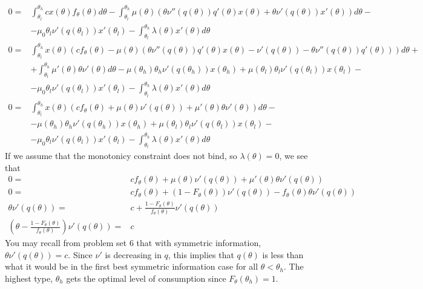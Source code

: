 \documentclass[12pt,reqno]{amsart}
\theoremstyle{definition}
\begin{document}
\begin{align*}
  0 = & \int_{\theta_l}^{\theta_h} c x(\theta) f_\theta(\theta)
  d\theta - \int_{\theta_l}^{\theta_h} \mu(\theta)
  \left( \theta \nu''(q(\theta))q'(\theta) x(\theta) + \theta
    \nu'(q(\theta)) x'(\theta) \right)d\theta - \\
  & - \mu_0 \theta_l
  \nu'(q(\theta_l))x'(\theta_l) - \int_{\theta_l}^{\theta_h}
  \lambda(\theta) x'(\theta) d\theta \\
  0 = & \int_{\theta_l}^{\theta_h} x(\theta)\left( c f_\theta(\theta)
    - \mu(\theta) \left( \theta \nu''(q(\theta))q'(\theta) x(\theta) -
      \nu'(q(\theta)) - \theta \nu''(q(\theta))q'(\theta) \right) \right)
  d\theta + \\
  & + \int_{\theta_l}^{\theta_h} 
  \mu'(\theta) \theta \nu'(\theta) d\theta 
  - \mu(\theta_h)\theta_h \nu'(q(\theta_h))x(\theta_h) +
  \mu(\theta_l)\theta_l \nu'(q(\theta_l))x(\theta_l) - \\
  & - \mu_0 \theta_l \nu'(q(\theta_l))x'(\theta_l) 
  - \int_{\theta_l}^{\theta_h} \lambda(\theta) x'(\theta) d\theta \\
  0 = & \int_{\theta_l}^{\theta_h} x(\theta)\left( c f_\theta(\theta)
    + \mu(\theta) \nu'(q(\theta)) + 
    \mu'(\theta) \theta \nu'(\theta)\right) d\theta  - \\
    & - \mu(\theta_h)\theta_h \nu'(q(\theta_h))x(\theta_h) +
    \mu(\theta_l)\theta_l \nu'(q(\theta_l))x(\theta_l) - \\
    & - \mu_0 \theta_l \nu'(q(\theta_l))x'(\theta_l) 
    - \int_{\theta_l}^{\theta_h} \lambda(\theta) x'(\theta) d\theta 
\end{align*}
If we assume that the monotonicy constraint does not bind, so
$\lambda(\theta) = 0$, we see that
\begin{align*}
  0 = &c f_\theta(\theta) + \mu(\theta) \nu'(q(\theta)) + \mu'(\theta)
   \theta \nu'(q(\theta))  \\
   0 = & cf_\theta(\theta) + (1-F_\theta(\theta)) \nu'(q(\theta)) -
   f_{\theta}(\theta) \theta \nu'(q(\theta)) \\
   \theta \nu'(q(\theta)) = & c +
   \frac{1-F_\theta(\theta)}{f_\theta(\theta)} \nu'(q(\theta)) \\
   \left(\theta - \frac{1-F_\theta(\theta)}{f_\theta(\theta)}
   \right)\nu'(q(\theta)) = & c 
 \end{align*}
You may recall from problem set 6 that with symmetric information,
$\theta \nu'(q(\theta)) = c$. Since $\nu'$ is decreasing in $q$, this
implies that $q(\theta)$ is less than what it would be in the first
best symmetric information case for all $\theta < \theta_h$. The
highest type, $\theta_h$ gets the optimal level of consumption since
$F_\theta(\theta_h) = 1$. 
 
\end{document}
